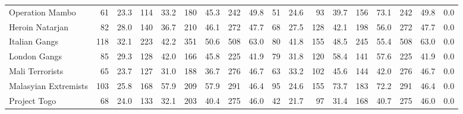 \begin{tabular}{lrrrrrrrrrrrrrrrrl}
Operation Mambo      &                61 &  23.3 &  114 &  33.2 &  180 &  45.3 &  242 &  49.8 &               51 &   24.6 &   93 &   39.7 &  156 &   73.1 &  242 &  49.8 &        0.0 \\
Heroin Natarjan      &                82 &  28.0 &  140 &  36.7 &  210 &  46.1 &  272 &  47.7 &               68 &   27.5 &  128 &   42.1 &  198 &   56.0 &  272 &  47.7 &        0.0 \\
Italian Gangs        &               118 &  32.1 &  223 &  42.2 &  351 &  50.6 &  508 &  63.0 &               80 &   41.8 &  155 &   48.5 &  245 &   55.4 &  508 &  63.0 &        0.0 \\
London Gangs         &                85 &  29.3 &  128 &  42.0 &  166 &  45.8 &  225 &  41.9 &               79 &   31.8 &  120 &   58.4 &  141 &   57.6 &  225 &  41.9 &        0.0 \\
Mali Terrorists      &                65 &  23.7 &  127 &  31.0 &  188 &  36.7 &  276 &  46.7 &               63 &   33.2 &  102 &   45.6 &  144 &   42.0 &  276 &  46.7 &        0.0 \\
Malasyian Extremists &               103 &  25.8 &  168 &  57.9 &  209 &  57.9 &  291 &  46.4 &               95 &   24.6 &  155 &   73.7 &  183 &   72.2 &  291 &  46.4 &        0.0 \\
Project Togo         &                68 &  24.0 &  133 &  32.1 &  203 &  40.4 &  275 &  46.0 &               42 &   21.7 &   97 &   31.4 &  168 &   40.7 &  275 &  46.0 &        0.0 \\
\bottomrule
\end{tabular}
